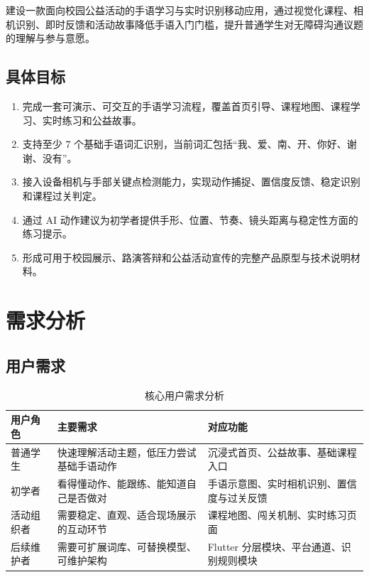 \documentclass[UTF8,a4paper,12pt]{ctexart}
\begin{document}
建设一款面向校园公益活动的手语学习与实时识别移动应用，通过视觉化课程、相机识别、即时反馈和活动故事降低手语入门门槛，提升普通学生对无障碍沟通议题的理解与参与意愿。

\subsection{具体目标}

\begin{enumerate}
  \item 完成一套可演示、可交互的手语学习流程，覆盖首页引导、课程地图、课程学习、实时练习和公益故事。
  \item 支持至少 7 个基础手语词汇识别，当前词汇包括“我、爱、南、开、你好、谢谢、没有”。
  \item 接入设备相机与手部关键点检测能力，实现动作捕捉、置信度反馈、稳定识别和课程过关判定。
  \item 通过 AI 动作建议为初学者提供手形、位置、节奏、镜头距离与稳定性方面的练习提示。
  \item 形成可用于校园展示、路演答辩和公益活动宣传的完整产品原型与技术说明材料。
\end{enumerate}

\section{需求分析}

\subsection{用户需求}

\begin{table}[htbp]
\centering
\caption{核心用户需求分析}
\begin{tabularx}{\textwidth}{p{3.1cm}Y Y}
\toprule
用户角色 & 主要需求 & 对应功能 \\
\midrule
普通学生 & 快速理解活动主题，低压力尝试基础手语动作 & 沉浸式首页、公益故事、基础课程入口 \\
初学者 & 看得懂动作、能跟练、能知道自己是否做对 & 手语示意图、实时相机识别、置信度与过关反馈 \\
活动组织者 & 需要稳定、直观、适合现场展示的互动环节 & 课程地图、闯关机制、实时练习页面 \\
后续维护者 & 需要可扩展词库、可替换模型、可维护架构 & Flutter 分层模块、平台通道、识别规则模块 \\
\bottomrule
\end{tabularx}
\end{table}
\end{document}

